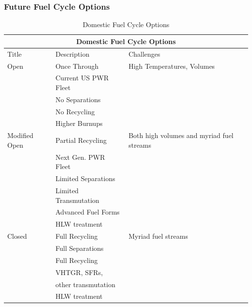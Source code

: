 \begin{frame}[ctb!]
  \frametitle{Future Fuel Cycle Options}
    \begin{table}
      \centering
      \footnotesize{
      \begin{tabular}{|l|l|l|}
        \multicolumn{3}{c}{\textbf{Domestic Fuel Cycle Options}}\\
        \hline
        Title & Description& Challenges \\
        \hline
        \hline
        Open          & Once Through         & High Temperatures, Volumes \\
                      & Current US PWR Fleet &      \\
                      & No Separations       &      \\
                      & No Recycling         &      \\
                      & Higher Burnups &      \\
        \hline
        Modified Open & Partial Recycling    & Both high volumes and myriad fuel streams \\
                      & Next Gen. PWR Fleet &      \\
                      & Limited Separations  &      \\
                      & Limited Transmutation &      \\
                      & Advanced Fuel Forms  &      \\
                      & HLW treatment    &          \\
        \hline
        Closed        & Full Recycling       & Myriad fuel streams \\
                      & Full Separations &      \\
                      & Full Recycling &      \\
                      & VHTGR, SFRs, &      \\
                      & other transmutation & \\
                      & HLW treatment  &      \\
        \hline
      \end{tabular}
      \caption[Fuel Cycle Options]{Domestic Fuel Cycle Options }
      \label{tab:fco}
      }
    \end{table}
\end{frame}




